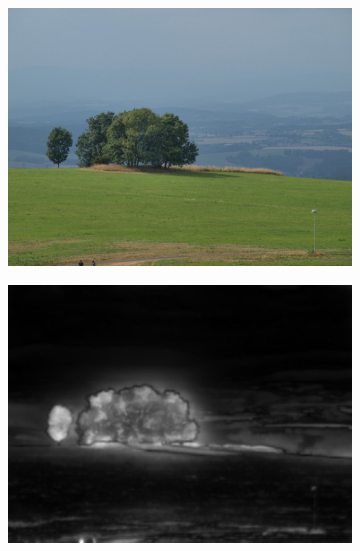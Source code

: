 \begin{figure}[H]
\begin{subfigure}{.32\textwidth}
    \end{subfigure}
    \vspace{2pt}
    
    \begin{subfigure}{0.32\textwidth}
      \centering
      \includegraphics[scale=1.0]{obrazky/ORIG35.jpg}
      \caption{}
    \end{subfigure}
    \begin{subfigure}{.32\textwidth}
      \centering
      \includegraphics[scale=1.0]{obrazky/ittiSM35.jpg}
      \caption{}
    \end{subfigure}
    \begin{subfigure}{.32\textwidth}
      \centering

\end{subfigure}
\end{figure}

